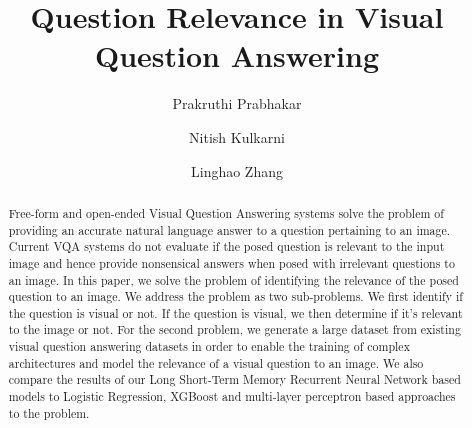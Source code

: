 \documentclass[sigconf]{acmart}
\begin{document}
\title{Question Relevance in Visual Question Answering}
\author{Prakruthi Prabhakar}

\author{Nitish Kulkarni}

\author{Linghao Zhang}

\begin{abstract}
Free-form and open-ended Visual Question Answering systems solve the problem of providing an accurate natural language answer to a question pertaining to an image. Current VQA systems do not evaluate if the posed question is relevant to the input image and hence provide nonsensical answers when posed with irrelevant questions to an image. In this paper, we solve the problem of identifying the relevance of the posed question to an image. We address the problem as two sub-problems. We first identify if the question is visual or not. If the question is visual, we then determine if it's relevant to the image or not. 
For the second problem, we generate a large dataset from existing visual question answering datasets in order to enable the training of complex architectures and model the relevance of a visual question to an image. We also compare the results of our Long Short-Term Memory Recurrent Neural Network based models to Logistic Regression, XGBoost and multi-layer perceptron based approaches to the problem.
\end{abstract}

\maketitle




 
\end{document}
